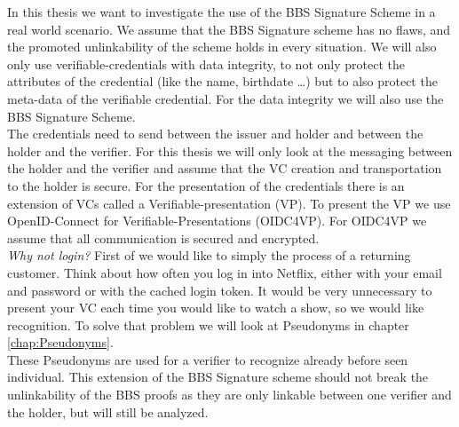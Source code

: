 \documentclass[
	a4paper               %
	,bibliography=totoc   %
	,listof=totoc         %
	,monolingual
	twoside=false,
]{bfhthesis}              %
\begin{document}
In this thesis we want to investigate the use of the BBS Signature Scheme in a real world scenario.
We assume that the BBS Signature scheme has no flaws, and the promoted unlinkability of the scheme holds in every situation.
We will also only use verifiable-credentials with data integrity, to not only protect the attributes of the credential (like the name, birthdate \dots) but to also protect the meta-data of the verifiable credential.
For the data integrity we will also use the BBS Signature Scheme.\\

The credentials need to send between the issuer and holder and between the holder and the verifier.
For this thesis we will only look at the messaging between the holder and the verifier and assume that the VC creation and transportation to the holder is secure.
For the presentation of the credentials there is an extension of VCs called a Verifiable-presentation (VP)\cite{verifiable-credentials}.
To present the VP we use OpenID-Connect for Verifiable-Presentations (OIDC4VP)\cite{oidc4vp}.
For OIDC4VP we assume that all communication is secured and encrypted.\\

\textit{Why not login?}
First of we would like to simply the process of a returning customer.
Think about how often you log in into Netflix, either with your email and password or with the cached login token.
It would be very unnecessary to present your VC each time you would like to watch a show, so we would like recognition.
To solve that problem we will look at Pseudonyms\cite{pseudonyms} in chapter \ref{chap:Pseudonyms}.\\

These Pseudonyms are used for a verifier to recognize already before seen individual.
This extension of the BBS Signature scheme should not break the unlinkability of the BBS proofs as they are only linkable between one verifier and the holder, but will still be analyzed.\\
\end{document}
